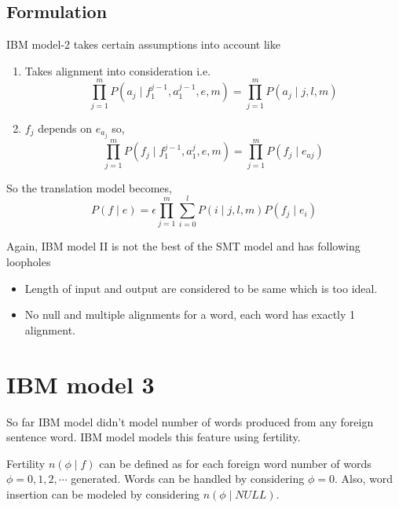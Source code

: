 \subsection{Formulation}
IBM model-2 takes certain assumptions into account like
\begin{enumerate}
\item Takes alignment into consideration i.e.
\begin{equation*}
\prod_{j=1}^{m}P(a_{j}\mid f_{1}^{j-1},a_{1}^{j-1},e,m) = \prod_{j=1}^{m}P(a_{j}\mid j,l,m)
\end{equation*}
\item $f_{j}$ depends on $e_{a_{j}}$ so,
\begin{equation*}
\prod_{j=1}^{m}P(f_{j}\mid f_{1}^{j-1},a_{1}^{j},e,m) = \prod_{j=1}^{m}P(f_{j}\mid e_{aj})
\end{equation*}
\end{enumerate}
So the translation model becomes,
\begin{equation}
P(f\mid e) = \epsilon\prod_{j=1}^{m}\sum_{i=0}^{l}P(i\mid j,l,m)P(f_{j}\mid e_{i})
\end{equation}

Again, IBM model II is not the best of the SMT model and has following loopholes
\begin{itemize}
\item Length of input and output are considered to be same which is too ideal.
\item No null and multiple alignments for a word, each word has exactly 1 alignment.
\end{itemize}

\section{IBM model 3}
So far IBM model didn't model number of words produced from any foreign sentence word. IBM model models this feature using fertility.

Fertility $n(\phi \mid f)$ can be defined as for each foreign word number of words $\phi = 0,1,2,\cdots$ generated. Words can be handled by considering $\phi=0$.
Also, word insertion can be modeled by considering $n(\phi \mid NULL)$.

